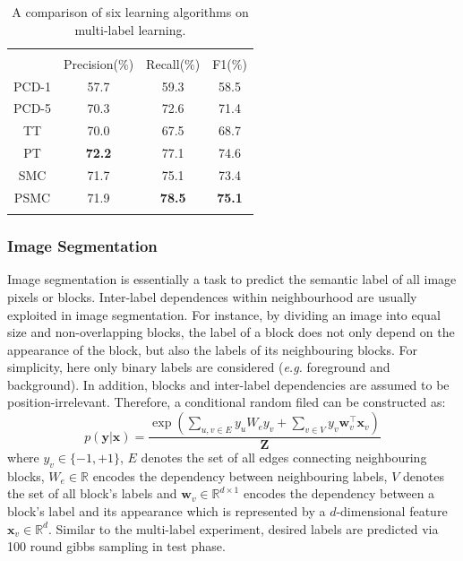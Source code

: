 \begin{table}
	\center
\begin{tabular}{cccc} 
\Xhline{2\arrayrulewidth} \\ 
       & Precision($\%$) & Recall($\%$) & F1($\%$) \\ \hline 
 PCD-1 & 57.7            & 59.3         & 58.5 \\
 PCD-5 & 70.3            & 72.6         & 71.4 \\
 TT    & 70.0            & 67.5         & 68.7 \\
 PT    & {\bf 72.2}      & 77.1         & 74.6 \\
SMC    & 71.7            & 75.1         & 73.4 \\
PSMC   & 71.9            & {\bf 78.5}   & {\bf 75.1} \\ 
\Xhline{2\arrayrulewidth}
 \end{tabular}
 \caption{A comparison of six learning algorithms on multi-label learning. }
	\label{tab:scene_results}
\end{table}

\subsubsection{Image Segmentation} 
Image segmentation is  essentially a task to predict the semantic label of all image pixels or blocks.    
Inter-label dependences within neighbourhood are usually exploited in image segmentation. For instance, by dividing an image into equal size and non-overlapping 
blocks, the label of a block does not only depend on the appearance of the block, but also the labels of its neighbouring blocks. For simplicity, here 
only binary labels are considered (\emph{e.g.} foreground and background). 
In addition, blocks and inter-label dependencies are assumed to be position-irrelevant. Therefore, a conditional random filed can 
be constructed as:               
\begin{equation}
	p(\mathbf{y}|\mathbf{x})=\frac{\exp(\sum_{u,v\in E}y_u W_e y_v+\sum_{v\in V} y_v \mathbf{w}_v^\top \mathbf{x}_v) }{\mathbf{Z}}
\end{equation}
where $y_v\in\{-1,+1\}$, $E$ denotes the set of all edges connecting neighbouring blocks, $W_e\in\mathbb{R}$ encodes the dependency between neighbouring labels, $V$ denotes the set of all 
block's labels and $\mathbf{w}_v\in \mathbb{R}^{d\times 1}$ encodes the dependency between a block's label and its appearance which is represented by a $d$-dimensional feature $\mathbf{x}_v\in\mathbb{R}^d$.    
Similar to the multi-label experiment, desired labels are predicted via 100 round gibbs sampling in test phase.      

